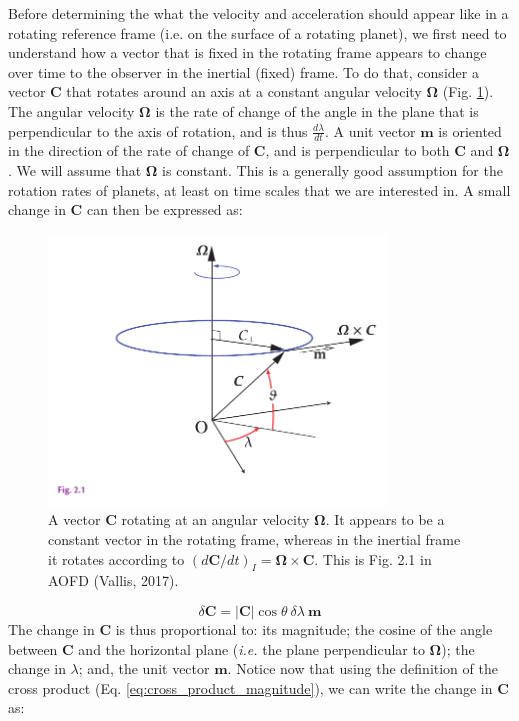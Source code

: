 \documentclass[12pt]{article}
\numberwithin{equation}{section}
\numberwithin{figure}{section}
\numberwithin{table}{section}
\begin{document}
Before determining the what the velocity and acceleration should appear like
in a rotating reference frame (i.e. on the surface of a rotating planet), we
first need to understand how a vector that is fixed in the rotating frame
appears to change over time to the observer in the inertial (fixed) frame.
To do that, consider a vector $\mathbf{C}$ that rotates around an axis at a
constant angular velocity $\mathbf{\Omega}$ (Fig. \ref{fig:rotating_vector}).
The angular velocity $\mathbf{\Omega}$ is the rate of change of the angle in
the plane that is perpendicular to the axis of rotation, and is thus
$\frac{d\lambda}{dt}$.
A unit vector $\mathbf{m}$ is oriented in the direction of the rate of change
of $\mathbf{C}$, and is perpendicular to both $\mathbf{C}$ and $\mathbf{\Omega}$.
We will assume that $\mathbf{\Omega}$ is constant.
This is a generally good assumption for the rotation rates of planets, at least
on time scales that we are interested in.
A small change in $\mathbf{C}$ can then be expressed as:

\begin{figure}[h]
  \centering
  \includegraphics[width=0.8\textwidth]{assets/fig_rotating_vector.pdf}
  \caption{
    A vector $\mathbf{C}$ rotating at an angular velocity $\mathbf{\Omega}$.
    It appears to be a constant vector in the rotating frame, whereas in the
    inertial frame it rotates according to
    $\left(d\mathbf{C}/dt\right)_I = \mathbf{\Omega} \times \mathbf{C}$.
    This is Fig. 2.1 in AOFD (Vallis, 2017).
  }
  \label{fig:rotating_vector}
\end{figure}

\begin{equation}
  \delta \mathbf{C} = |\mathbf{C}| \cos\theta\ \delta \lambda\ \mathbf{m}
\end{equation}
The change in $\mathbf{C}$ is thus proportional to:
its magnitude;
the cosine of the angle between $\mathbf{C}$ and the horizontal plane
(\textit{i.e.} the plane perpendicular to $\mathbf{\Omega}$);
the change in $\lambda$;
and, the unit vector $\mathbf{m}$.
Notice now that using the definition of the cross product (Eq. \ref{eq:cross_product_magnitude}),
we can write the change in $\mathbf{C}$ as:
\end{document}
